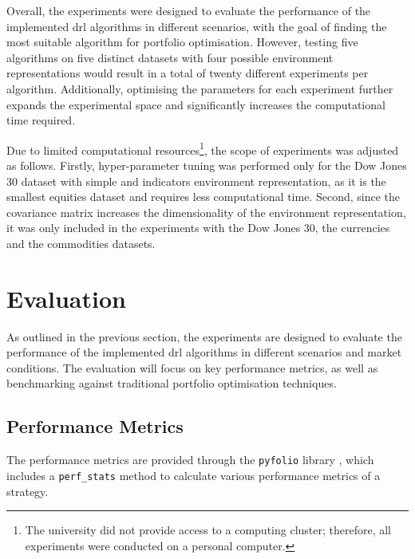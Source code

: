 Overall, the experiments were designed to evaluate the performance of the implemented \acrshort{drl} algorithms in different scenarios, with the goal of finding the most suitable algorithm for portfolio optimisation. However, testing five algorithms on five distinct datasets with four possible environment representations would result in a total of twenty different experiments per algorithm. Additionally, optimising the parameters for each experiment further expands the experimental space and significantly increases the computational time required. 

Due to limited computational resources\footnote{The university did not provide access to a computing cluster; therefore, all experiments were conducted on a personal computer.}, the scope of experiments was adjusted as follows. Firstly, hyper-parameter tuning was performed only for the Dow Jones 30 dataset with simple and indicators environment representation, as it is the smallest equities dataset and requires less computational time. Second, since the covariance matrix increases the dimensionality of the environment representation, it was only included in the experiments with the Dow Jones 30, the currencies and the commodities datasets.
\section{Evaluation} \label{sec:evaluation}

As outlined in the previous section, the experiments are designed to evaluate the performance of the implemented \acrshort{drl} algorithms in different scenarios and market conditions. The evaluation will focus on key performance metrics, as well as benchmarking against traditional portfolio optimisation techniques.

\subsection{Performance Metrics} \label{sec:performance-metrics}

The performance metrics are provided through the \texttt{pyfolio} library \cite{pyfolio}, which includes a \texttt{perf\_stats} method to calculate various performance metrics of a strategy. 

